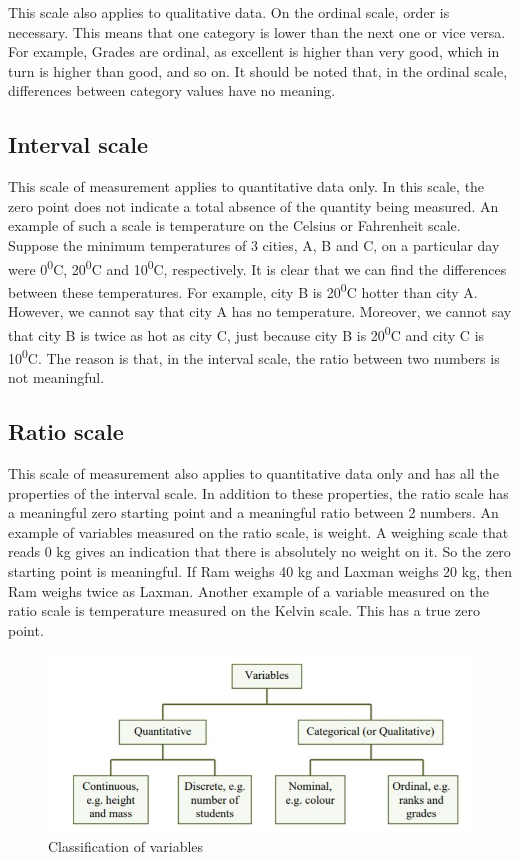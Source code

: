 \documentclass[
]{book}
\begin{document}
This scale also applies to qualitative data. On the
ordinal scale, order is necessary. This means that one category is lower than the next one or vice versa. For example, Grades are ordinal, as excellent is higher than very good, which in turn is higher than good, and so on. It should be noted that, in the ordinal scale, differences between category values have no meaning.

\hypertarget{interval-scale}{%
\subsection{Interval scale}\label{interval-scale}}

This scale of measurement applies to quantitative
data only. In this scale, the zero point does not indicate a total absence of the quantity being measured. An example of such a scale is temperature on the Celsius or Fahrenheit scale. Suppose the minimum temperatures of 3 cities, A, B and C, on a particular day were 0\textsuperscript{0}C, 20\textsuperscript{0}C and 10\textsuperscript{0}C, respectively. It is clear that we can find the differences between these temperatures. For example, city B is 20\textsuperscript{0}C hotter than city A. However, we cannot say that city A has no temperature. Moreover, we cannot say that city B is twice as hot as city C, just because city B is 20\textsuperscript{0}C and city C is 10\textsuperscript{0}C. The reason is that, in the interval scale, the ratio between two numbers is not meaningful.

\hypertarget{ratio-scale}{%
\subsection{Ratio scale}\label{ratio-scale}}

This scale of measurement also applies to quantitative
data only and has all the properties of the interval scale. In addition to these properties, the ratio scale has a meaningful zero starting point and a meaningful ratio between 2 numbers. An example of variables measured on the ratio scale, is weight. A weighing scale that reads 0 kg
gives an indication that there is absolutely no weight on it. So the zero starting point is meaningful. If Ram weighs 40 kg and Laxman weighs 20 kg, then Ram weighs twice as Laxman. Another example of a variable measured on the ratio scale is temperature measured on the Kelvin scale. This has a true zero point.

\begin{figure}

{\centering \includegraphics[width=0.7\linewidth]{images/image2} 

}

\caption{Classification of variables}\label{fig:variables}
\end{figure}
\end{document}
